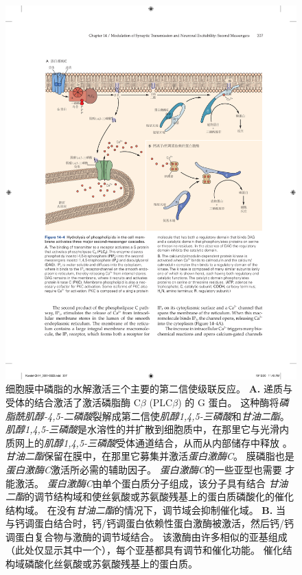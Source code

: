 \begin{figure}[htbp]
	\centering
	\includegraphics[width=0.95\linewidth]{chap14/fig_14_4}
	\caption{细胞膜中磷脂的水解激活三个主要的第二信使级联反应。
		\textbf{A.} 递质与受体的结合激活了激活磷脂酶 C$\beta$ (PLC$\beta$) 的 G 蛋白。
		这种酶将\textit{磷脂酰肌醇-4,5-二磷酸}裂解成第二信使\textit{肌醇1,4,5-三磷酸}和\textit{甘油二酯}。
		\textit{肌醇1,4,5-三磷酸}是水溶性的并扩散到细胞质中，在那里它与光滑内质网上的\textit{肌醇1,4,5-三磷酸}受体通道结合，从而从内部储存中释放 。
		\textit{甘油二酯}保留在膜中，在那里它募集并激活\textit{蛋白激酶C}。
		膜磷脂也是\textit{蛋白激酶C}激活所必需的辅助因子。
		\textit{蛋白激酶C}的一些亚型也需要  才能激活。
		\textit{蛋白激酶C}由单个蛋白质分子组成，该分子具有结合 \textit{甘油二酯}的调节结构域和使丝氨酸或苏氨酸残基上的蛋白质磷酸化的催化结构域。
		在没有\textit{甘油二酯}的情况下，调节域会抑制催化域。
		\textbf{B.} 当  与钙调蛋白结合时，钙/钙调蛋白依赖性蛋白激酶被激活，然后钙/钙调蛋白复合物与激酶的调节域结合。
		该激酶由许多相似的亚基组成（此处仅显示其中一个），每个亚基都具有调节和催化功能。
		催化结构域磷酸化丝氨酸或苏氨酸残基上的蛋白质。}
	\label{fig:14_4}
\end{figure}


